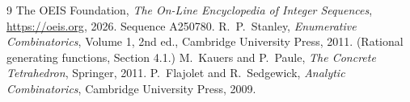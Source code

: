 \documentclass[11pt,a4paper]{article}
\theoremstyle{plain}
\theoremstyle{definition}
\begin{document}
\begin{thebibliography}{9}
 The OEIS Foundation, \emph{The On-Line Encyclopedia of Integer
Sequences}, \url{https://oeis.org}, 2026. Sequence A250780.
 R.~P.~Stanley, \emph{Enumerative Combinatorics}, Volume 1, 2nd ed.,
Cambridge University Press, 2011. (Rational generating functions, Section 4.1.)
 M.~Kauers and P.~Paule, \emph{The Concrete Tetrahedron}, Springer, 2011.
 P.~Flajolet and R.~Sedgewick, \emph{Analytic Combinatorics}, Cambridge
University Press, 2009.
\end{thebibliography}
\end{document}

